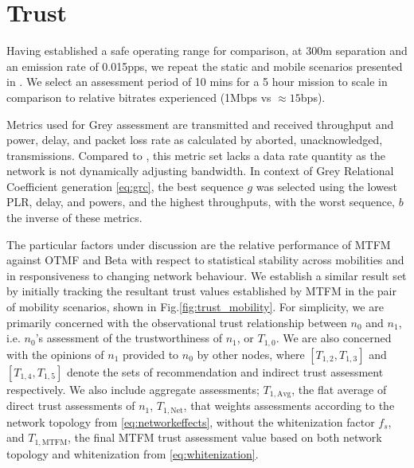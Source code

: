 \documentclass[conference]{IEEEtran}
\begin{document}
\section{Trust}\label{sec:trustresultsanddiscussion}

Having established a safe operating range for comparison, at 300m separation and an emission rate of 0.015pps, we repeat the static and mobile scenarios presented in \cite{Guo11}. We select an assessment period of 10 mins for a 5 hour mission to scale in comparison to relative bitrates experienced (1Mbps vs $\approx15$bps).

Metrics used for Grey assessment are transmitted and received throughput and power, delay, and packet loss rate as calculated by aborted, unacknowledged, transmissions.
Compared to \cite{Guo11}, this metric set lacks a data rate quantity as the network is not dynamically adjusting bandwidth.
In context of Grey Relational Coefficient generation \eqref{eq:grc}, the best sequence $g$ was selected using the lowest PLR, delay, and powers, and the highest throughputs, with the worst sequence, $b$ the inverse of these metrics.

The particular factors under discussion are the relative performance of MTFM against OTMF and Beta with respect to statistical stability across mobilities and in responsiveness to changing network behaviour. 
We establish a similar result set by initially tracking the resultant trust values established by MTFM in the pair of mobility scenarios, shown in Fig.\ref{fig:trust_mobility}.
For simplicity, we are primarily concerned with the observational trust relationship between $n_0$ and $n_1$, i.e. $n_0$'s assessment of the trustworthiness of $n_1$, or $T_{1,0}$.
We are also concerned with the opinions of $n_1$ provided to $n_0$ by other nodes, where $[T_{1,2},T_{1,3}]$ and $[T_{1,4},T_{1,5}]$ denote the sets of recommendation and indirect trust assessment respectively.
We also include aggregate assessments; $T_{1,\text{Avg}}$, the flat average of direct trust assessments of $n_1$, $T_{1,\text{Net}}$, that weights assessments according to the network topology from \eqref{eq:networkeffects}, without the whitenization factor $f_s$, and $T_{1,\text{MTFM}}$, the final MTFM trust assessment value based on both network topology and whitenization from \eqref{eq:whitenization}.
\end{document}
